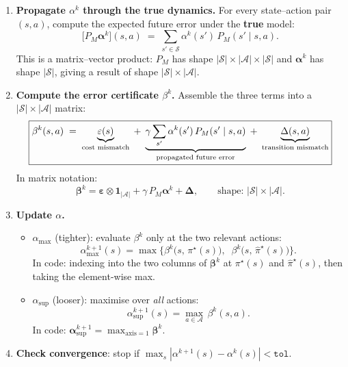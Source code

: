 \documentclass[11pt]{article}
\newcommand{\pistar}{\pi^\star}
\newcommand{\pihatstar}{\hat\pi^\star}
\begin{document}
\begin{enumerate}
\item \textbf{Propagate $\alpha^k$ through the true dynamics.}
For every state--action pair $(s, a)$, compute the expected future error
under the \textbf{true} model:
\begin{equation}\label{eq:propagate-q}
  \bigl[P_M \boldsymbol{\alpha}^k\bigr](s, a)
  \;=\; \sum_{s' \in \mathcal{S}} \alpha^k(s')\, P_M(s' \mid s, a).
\end{equation}
This is a matrix--vector product: $P_M$ has shape $|\mathcal{S}| \times
|\mathcal{A}| \times |\mathcal{S}|$ and $\boldsymbol{\alpha}^k$ has shape
$|\mathcal{S}|$, giving a result of shape $|\mathcal{S}| \times |\mathcal{A}|$.

\item \textbf{Compute the error certificate $\beta^k$.}
Assemble the three terms into a $|\mathcal{S}| \times |\mathcal{A}|$ matrix:
\begin{equation}\label{eq:beta-q}
  \boxed{%
    \beta^k(s, a)
    \;=\; \underbrace{\varepsilon(s)}_{\text{cost mismatch}}
    \;+\; \underbrace{\gamma \sum_{s'} \alpha^k(s')\, P_M(s' \mid s, a)}_{\text{propagated future error}}
    \;+\; \underbrace{\Delta(s, a)}_{\text{transition mismatch}}
  }
\end{equation}
In matrix notation:
\[
  \boldsymbol{\beta}^k
  = \boldsymbol{\varepsilon} \otimes \mathbf{1}_{|\mathcal{A}|}
  + \gamma\, P_M \boldsymbol{\alpha}^k
  + \boldsymbol{\Delta},
  \qquad \text{shape: } |\mathcal{S}| \times |\mathcal{A}|.
\]

\item \textbf{Update $\alpha$.}
\begin{itemize}
  \item $\alpha_{\max}$ (tighter): evaluate $\beta^k$ only at the two relevant
        actions:
  \begin{equation}\label{eq:alpha-max-q}
    \alpha^{k+1}_{\max}(s) = \max\!\Big\{
      \beta^k\bigl(s,\, \pistar(s)\bigr),\;\;
      \beta^k\bigl(s,\, \pihatstar(s)\bigr)
    \Big\}.
  \end{equation}
  In code: indexing into the two columns of $\boldsymbol{\beta}^k$ at
  $\pistar(s)$ and $\pihatstar(s)$, then taking the element-wise max.

  \item $\alpha_{\sup}$ (looser): maximise over \emph{all} actions:
  \begin{equation}\label{eq:alpha-sup-q}
    \alpha^{k+1}_{\sup}(s) = \max_{a \in \mathcal{A}}\, \beta^k(s, a).
  \end{equation}
  In code: $\boldsymbol{\alpha}^{k+1}_{\sup} = \max_{\text{axis}=1}
  \boldsymbol{\beta}^k$.
\end{itemize}

\item \textbf{Check convergence}: stop if
$\max_s |\alpha^{k+1}(s) - \alpha^k(s)| < \texttt{tol}$.
\end{enumerate}
\end{document}
